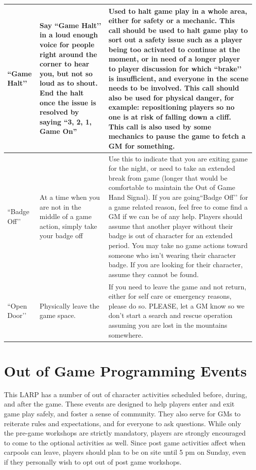 \documentclass[sheet]{GL2020}
\begin{document}
\begin{tabularx}{\textwidth}{|>{\centering\arraybackslash} m{1.5cm} | >{\centering\arraybackslash} m{1.8cm} | >{\centering\arraybackslash} X|}
    \hline
``Game Halt’’ & Say ``Game Halt’’ in a loud enough voice for people right around the corner to hear you, but not so loud as to shout. End the halt once the issue is resolved by saying “3, 2, 1, Game On” &  Used to halt game play in a whole area, either for safety or a mechanic. This call should be used to halt game play to sort out a safety issue such as a player being too activated to continue at the moment, or in need of a longer player to player discussion for which ``brake’’ is insufficient, and everyone in the scene needs to be involved. This call should also be used for physical danger, for example: repositioning players so no one is at risk of falling down a cliff. This call is also used by some mechanics to pause the game to fetch a GM for something. \\
    \hline
``Badge Off’’ & At a time when you are not in the middle of a game action, simply take your badge off & Use this to indicate that you are exiting game for the night, or need to take an extended break from game (longer that would be comfortable to maintain the Out of Game Hand Signal). If you are going``Badge Off’’ for a game related reason, feel free to come find a GM if we can be of any help. Players should assume that another player without their badge is out of character for an extended period. You may take no game actions toward someone who isn’t wearing their character badge. If you are looking for their character, assume they cannot be found. \\
    \hline
``Open Door’’ & Physically leave the game space. & If you need to leave the game and not return, either for self care or emergency reasons, please do so. PLEASE, let a GM know so we don't start a search and rescue operation assuming you are lost in the mountains somewhere. \\
    \hline
 \end{tabularx}

\section{Out of Game Programming Events}
This LARP has a number of out of character activities scheduled before, during, and after the game. These events are designed to help players enter and exit game play safely, and foster a sense of community. They also serve for GMs to reiterate rules and expectations, and for everyone to ask questions. While only the pre-game workshops are strictly mandatory, players are strongly encouraged to come to the optional activities as well. Since post game activities affect when carpools can leave, players should plan to be on site until 5 pm on Sunday, even if they personally wish to opt out of post game workshops.
\end{document}
